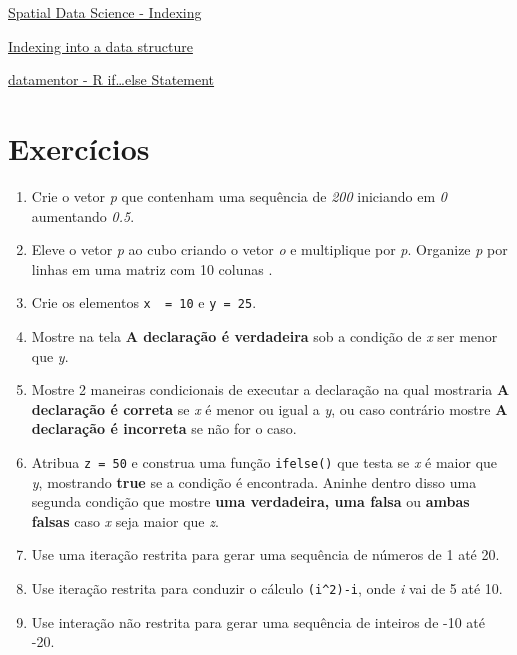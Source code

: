 \documentclass[
]{book}
\providecommand{\tightlist}{%
  \setlength{\itemsep}{0pt}\setlength{\parskip}{0pt}}
\begin{document}
\citet{melloandpeternelli2013}

\citet{RogerPeng2020RPro}

\citet{Kabacoff2015R}

\citet{VenablesSmithRTeamCore2017}

\citet{Neth2021}

\citet{Yamamoto2020}

\citet{SergioFreireINTRO2020}

\href{https://rspatial.org/intr/4-indexing.html}{Spatial Data Science - Indexing}

\href{http://www.cookbook-r.com/Basics/Indexing_into_a_data_structure/}{Indexing into a data structure}

\href{https://www.datamentor.io/r-programming/if-else-statement/}{datamentor - R if\ldots else Statement}

\hypertarget{exercuxedcios}{%
\section{Exercícios}\label{exercuxedcios}}

\begin{enumerate}
\def\labelenumi{\arabic{enumi}.}
\tightlist
\item
  Crie o vetor \emph{p} que contenham uma sequência de \emph{200} iniciando em \emph{0} aumentando \emph{0.5}.
\item
  Eleve o vetor \emph{p} ao cubo criando o vetor \emph{o} e multiplique por \emph{p}.
  Organize \emph{p} por linhas em uma matriz com 10 colunas .\\
\item
  Crie os elementos \texttt{x\ \ =\ 10} e \texttt{y\ =\ 25}.
\item
  Mostre na tela \textbf{A declaração é verdadeira} sob a condição de \emph{x} ser menor que \emph{y}.
\item
  Mostre 2 maneiras condicionais de executar a declaração na qual mostraria \textbf{A declaração é correta} se \emph{x} é menor ou igual a \emph{y}, ou caso contrário mostre \textbf{A declaração é incorreta} se não for o caso.
\item
  Atribua \texttt{z\ =\ 50} e construa uma função \texttt{ifelse()} que testa se \emph{x} é maior que \emph{y}, mostrando \textbf{true} se a condição é encontrada. Aninhe dentro disso uma segunda condição que mostre \textbf{uma verdadeira, uma falsa} ou \textbf{ambas falsas} caso \emph{x} seja maior que \emph{z}.
\item
  Use uma iteração restrita para gerar uma sequência de números de 1 até 20.
\item
  Use iteração restrita para conduzir o cálculo \texttt{(i\^{}2)-i}, onde \emph{i} vai de 5 até 10.
\item
  Use interação não restrita para gerar uma sequência de inteiros de -10 até -20.
\end{enumerate}

  
\end{document}
